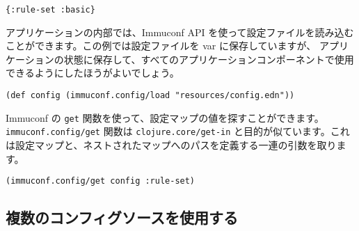 \begin{lstlisting}[numbers=none]
{:rule-set :basic}
\end{lstlisting}

アプリケーションの内部では、Immuconf API を使って設定ファイルを読み込むことができます。この例では設定ファイルを var に保存していますが、 アプリケーションの状態に保存して、すべてのアプリケーションコンポーネントで使用できるようにしたほうがよいでしょう。


\begin{lstlisting}[numbers=none]
(def config (immuconf.config/load "resources/config.edn"))
\end{lstlisting}

Immuconf の \texttt{get} 関数を使って、設定マップの値を探すことができます。\texttt{immuconf.config/get} 関数は \texttt{clojure.core/get-in} と目的が似ています。これは設定マップと、ネストされたマップへのパスを定義する一連の引数を取ります。


\begin{lstlisting}[numbers=none]
(immuconf.config/get config :rule-set)
\end{lstlisting}


\subsection{複数のコンフィグソースを使用する}



